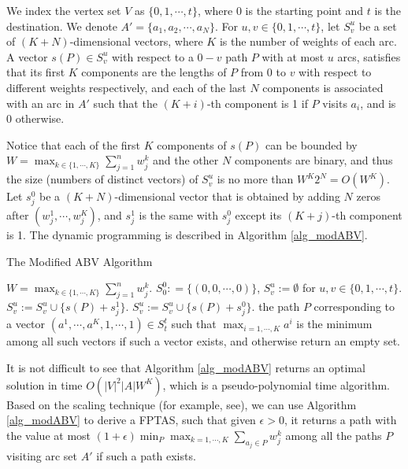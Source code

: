 \documentclass{llncs}
\numberwithin{subcase}{case}
\begin{document}
We index the vertex set $V$ as $\{0, 1, \cdots, t\}$, where $0$ is the starting point and $t$ is the destination. We denote $A' = \{a_1, a_2, \cdots, a_N\}$. For $u,v \in\{ 0,1, \cdots, t\}$, let $S^u_v$ be a set of $(K + N)$-dimensional vectors, where $K$ is the number of weights of each arc. A vector $s(P) \in S^u_v$ with respect to a $0-v$ path $P$ with at most $u$ arcs, satisfies that its first $K$ components are the lengths of $P$ from $0$ to $v$ with respect to different weights respectively, and each of the last $N$ components is associated with an arc in $A'$ such that the $(K + i)$-th component is 1 if $P$ visits $a_i$, and is 0 otherwise.

Notice that each of the first $K$ components of $s(P)$ can be bounded by $W = \max_{k \in \{1, \cdots, K\}}\sum_{j = 1}^{n}{w^k_{j}}$ and the other $N$ components are binary, and thus the size (numbers of distinct vectors) of $S^u_v$ is no more than $W^K2^N = O(W^K)$. Let $s_j^0$ be a $(K + N)$-dimensional vector that is obtained by adding $N$ zeros after $(w_j^1,\cdots,w_j^K)$, and $s_j^1$ is the same with $s_j^0$ except its $(K + j)$-th component is 1. The dynamic programming is described in Algorithm \ref{alg_modABV}.

\begin{algorithm}[htb]
\caption{The Modified ABV Algorithm}
\label{alg_modABV}
\begin{algorithmic}[1]
\STATE $W = \max_{k \in \{1, \cdots, K\}}\sum_{j = 1}^{n}{w^k_{j}}$.
\STATE $S^0_0 : = \{(0, 0, \cdots, 0)\}$, $S^u_v:=\emptyset$ for $u,v \in\{ 0,1, \cdots, t\}$.
                 \STATE $S^u_v:= S^u_v \cup \{s(P)+s_j^1\}$.
                 \ELSE
                 \STATE $S^u_v:= S^u_v \cup \{s(P)+s_j^0\}$.
                \ENDIF
            \ENDIF
            \ENDFOR
        \ENDFOR
    \ENDFOR
\ENDFOR
\RETURN the path $P$ corresponding to a vector $(a^1, \cdots, a^K, 1, \cdots, 1) \in S^t_t$ such that $\max_{i=1, \cdots, K}a^i$ is the minimum among all such vectors if such a vector exists, and otherwise return an empty set.
\end{algorithmic}
\end{algorithm}

It is not difficult to see that Algorithm \ref{alg_modABV} returns an optimal solution in time $O(|V|^2|A|W^K)$, which is a pseudo-polynomial time algorithm. Based on the scaling technique (for example, see\cite{ABV06}), we can use Algorithm \ref{alg_modABV} to derive a FPTAS, such that given $\epsilon >0$, it returns a path with the value at most $(1+\epsilon) \min_P\max_{k=1, \cdots, K}\sum _{a_j\in P}w^k_j$ among all the paths $P$ visiting arc set $A'$ if such a path exists.
\end{document}
